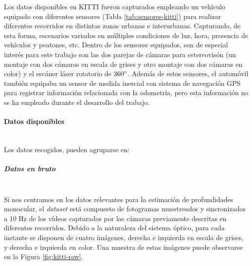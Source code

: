 Los datos disponibles en KITTI fueron capturados empleando un vehículo equipado con diferentes sensores (Tabla \ref{tab:sensores-kitti}) para realizar diferentes recorridos en distintas zonas urbanas e interurbanas. Capturando, de esta forma, escenarios variados en múltiples condiciones de luz, hora, presencia de vehículos y peatones, etc. Dentro de los sensores equipados, son de especial interés para este trabajo son las dos parejas de cámaras para estereovisón (un montaje con dos cámaras en escala de grises y otro montaje con dos cámaras en color) y el escáner láser rotatorio de $360\degree$. Además de estos sensores, el automóvil también equipaba un sensor de medida inercial con sistema de navegación GPS para registrar información relacionada con la odometría, pero esta información no se ha empleado durante el desarrollo del trabajo.

 
 

\paragraph{Datos disponibles}\mbox{}\\
Los datos recogidos, pueden agruparse en:

\subparagraph{Datos en bruto}\mbox{}\\
Si nos centramos en los datos relevantes para la estimación de profundidades monocular, el \textit{dataset} está compuesto de fotogramas muestreados y sincronizados a 10 Hz de los vídeos capturados por las cámaras previamente descritas en diferentes recorridos. Debido a la naturaleza del sistema óptico, para cada instante se disponen de cuatro imágenes, derecha e izquierda en escala de grises, y derecha e izquierda en color. Una muestra de estas imágenes puede observarse en la Figura \ref{fig:kitti-raw}.

